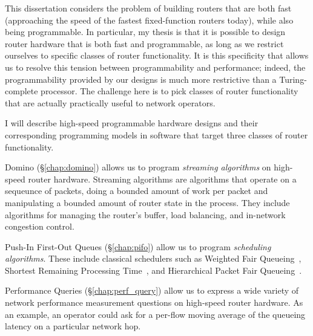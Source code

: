 This dissertation considers the problem of building routers that are both fast
(\ie approaching the speed of the fastest fixed-function routers today), while
also being programmable. In particular, my thesis is that it is possible to
design router hardware that is both fast and programmable, as long as we
restrict ourselves to specific classes of router functionality. It is this
specificity that allows us to resolve this tension between programmability and
performance; indeed, the programmability provided by our designs is much more
restrictive than a Turing-complete processor. The challenge here is to pick
classes of router functionality that are actually practically useful to network
operators.

I will describe high-speed programmable hardware designs and their
corresponding programming models in software that target three classes of
router functionality.
\begin{CompactEnumerate}
\item Domino (\S\ref{chap:domino}) allows us to program \textit{streaming
algorithms} on high-speed router hardware. Streaming algorithms are algorithms
that operate on a sequeunce of packets, doing a bounded amount of work per
packet and manipulating a bounded amount of router state in the process. They
include algorithms for managing the router's buffer, load balancing, and
in-network congestion control.
\item Push-In First-Out Queues (\S\ref{chap:pifo}) allow us to program \textit{
scheduling algorithms}. These include classical schedulers such as Weighted
Fair Queueing~\cite{wfq}, Shortest Remaining Processing Time~\cite{srpt}, and
Hierarchical Packet Fair Queueing~\cite{hpfq}.
\item Performance Queries (\S\ref{chap:perf_query}) allow us to express a wide
variety of network performance measurement questions on high-speed router hardware. As an example, an operator could ask for a per-flow moving average of the
queueing latency on a particular network hop.
\end{CompactEnumerate}

